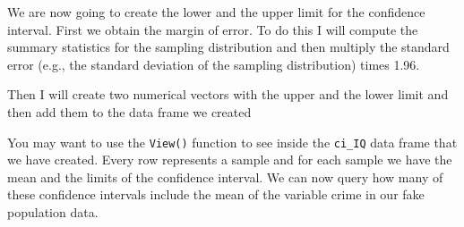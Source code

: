 \documentclass[
]{book}
\newenvironment{Shaded}{\begin{snugshade}}{\end{snugshade}}
\newcommand{\AttributeTok}[1]{\textcolor[rgb]{0.13,0.29,0.53}{#1}}
\newcommand{\CommentTok}[1]{\textcolor[rgb]{0.56,0.35,0.01}{\textit{#1}}}
\newcommand{\FloatTok}[1]{\textcolor[rgb]{0.00,0.00,0.81}{#1}}
\newcommand{\FunctionTok}[1]{\textcolor[rgb]{0.13,0.29,0.53}{\textbf{#1}}}
\newcommand{\NormalTok}[1]{#1}
\newcommand{\OtherTok}[1]{\textcolor[rgb]{0.56,0.35,0.01}{#1}}
\newcommand{\SpecialCharTok}[1]{\textcolor[rgb]{0.81,0.36,0.00}{\textbf{#1}}}
\begin{document}
We are now going to create the lower and the upper limit for the confidence interval. First we obtain the margin of error. To do this I will compute the summary statistics for the sampling distribution and then multiply the standard error (e.g., the standard deviation of the sampling distribution) times 1.96.

\begin{Shaded}
\end{Shaded}

Then I will create two numerical vectors with the upper and the lower limit and then add them to the data frame we created

\begin{Shaded}
\end{Shaded}

You may want to use the \texttt{View()} function to see inside the \texttt{ci\_IQ} data frame that we have created. Every row represents a sample and for each sample we have the mean and the limits of the confidence interval. We can now query how many of these confidence intervals include the mean of the variable crime in our fake population data.

\begin{Shaded}
\end{Shaded}
\end{document}
